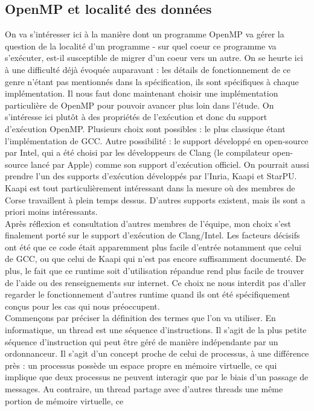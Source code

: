 \documentclass{report}
\begin{document}
\subsection{OpenMP et localité des données}
On va s'intéresser ici à la manière dont un programme OpenMP va gérer la question de la localité
d'un programme - sur quel coeur ce programme va s'exécuter, est-il susceptible de migrer d'un coeur
vers un autre. On se heurte ici à une difficulté déjà évoquée auparavant : les détails de 
fonctionnement de ce genre n'étant pas mentionnés dans la spécification, ils sont spécifiques à 
chaque implémentation. Il nous faut donc maintenant choisir une implémentation particulière 
de OpenMP pour pouvoir avancer plus loin dans l'étude. On s'intéresse ici plutôt à des propriétés
de l'exécution et donc du support d'exécution OpenMP. Plusieurs choix sont possibles : le plus
classique étant l'implémentation de GCC. Autre possibilité : le support développé en open-source 
par Intel, qui a été choisi par les développeurs de Clang (le compilateur open-source lancé par
Apple) comme son support d'exécution officiel. On pourrait aussi prendre l'un des supports 
d'exécution développés par l'Inria, Kaapi et StarPU. Kaapi est tout particulièrement intéressant
dans la mesure où des membres de Corse travaillent à plein temps dessus. D'autres supports existent,
mais ils sont a priori moins intéressants.
\\Après réflexion et consultation d'autres membres de l'équipe, mon choix s'est finalement porté
sur le support d'exécution de Clang/Intel. Les facteurs décisifs ont été que ce code était 
apparemment plus facile d'entrée notamment que celui de GCC, ou que celui de Kaapi qui n'est 
pas encore suffisamment documenté. De plus, le fait que ce runtime soit d'utilisation répandue
rend plus facile de trouver de l'aide ou des renseignements sur internet. Ce choix ne nous interdit
pas d'aller regarder le fonctionnement d'autres runtime quand ils ont été spécifiquement conçus pour
les cas qui nous préoccupent.
\\Commençons par préciser la définition des termes que l'on va utiliser. En informatique, un thread
est une séquence d'instructions. Il s'agit de la plus petite séquence d'instruction qui peut être
géré de manière indépendante par un ordonnanceur. Il s'agit d'un concept proche de celui de 
processus, à une différence près : un processus possède un espace propre en mémoire virtuelle, ce
qui implique que deux processus ne peuvent interagir que par le biais d'un passage de messages.
Au contraire, un thread partage avec d'autres threads une même portion de mémoire virtuelle, ce 
\end{document}
